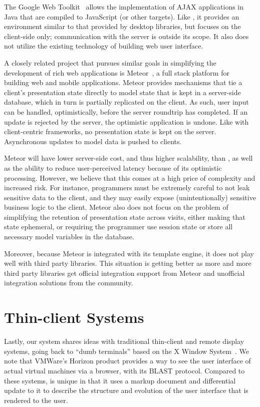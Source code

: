 The Google Web Toolkit~\cite{GWT} allows the implementation of
AJAX applications in Java that are compiled to JavaScript (or other
targets).  Like \projectname, it provides an environment similar to 
that provided by desktop libraries, but focuses on the client-side only; 
communication with the server is outside its scope.
It also does not utilize the existing technology of building web user interface.



A closely related project that pursues similar goals in simplifying the development
of rich web applications is Meteor~\cite{meteor}, a full stack platform for building 
web and mobile applications.  Meteor provides mechanisms that tie a client's presentation
state directly to model state that is kept in a server-side database, which in turn is 
partially replicated on the client.  As such, user input can be handled, optimistically, before 
the server roundtrip has completed. If an update is rejected by the server, the optimistic 
application is undone. Like with client-centric frameworks, no presentation state is kept on
the server. Asynchronous updates to model data is pushed to clients.

Meteor will have lower server-side cost, and thus higher scalability, than \cb, as well
as the ability to reduce user-perceived latency because of its optimistic processing.
However, we believe that this comes at a high price of complexity and increased risk.
For instance, programmers must be extremely careful to not leak sensitive data to the 
client, and they may easily expose (unintentionally) sensitive business logic to the client.  
Meteor also does not focus on the problem of simplifying the retention of presentation
state across visits, either making that state ephemeral, or requiring the programmer
use session state or store all necessary model variables in the database.

Moreover, because Meteor is integrated with its template engine, it does not play well
with third party \js libraries. This situation is getting better as more and more third
party libraries get official integration support from Meteor and unofficial integration
solutions from the community.


\section{Thin-client Systems}

Lastly, our system shares ideas with traditional thin-client and remote display 
systems, going back to ``dumb terminals'' based on the X Window 
System~\cite{ScheiflerGettys:acmtg1986}.  We note that VMWare's Horizon product provides
a way to see the user interface of actual virtual machines via a browser, with its
BLAST protocol.  Compared to these systems, \cb{} is 
unique in that it uses a markup document and differential update to it to 
describe the structure and evolution of the user interface that is rendered 
to the user.  
